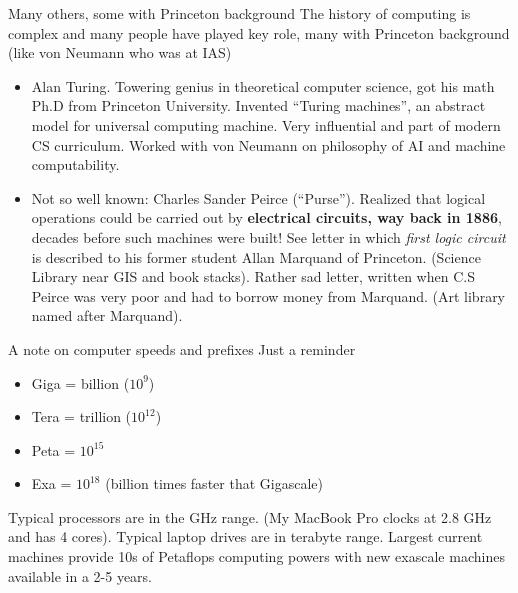\documentclass[aspectratio=169]{beamer}
\newcommand{\mypause}{\pause}
\begin{document}
\begin{frame}{Many others, some with Princeton background}
  The history of computing is complex and many people have played key
  role, many with Princeton background (like von Neumann who was at
  IAS)
  \begin{itemize}
  \item Alan Turing. Towering genius in theoretical computer science,
    got his math Ph.D from Princeton University. Invented ``Turing
    machines'', an abstract model for universal computing
    machine. Very influential and part of modern CS curriculum. Worked
    with von Neumann on philosophy of AI and machine computability.%
    \mypause%
  \item Not so well known: Charles Sander Peirce (``Purse''). Realized
    that logical operations could be carried out by {\bf electrical
      circuits, way back in 1886}, decades before such machines were
    built! See letter in which \emph{first logic circuit} is described
    to his former student Allan Marquand of Princeton. (Science
    Library near GIS and book stacks). Rather sad letter, written when
    C.S Peirce was very poor and had to borrow money from Marquand. (Art
    library named after Marquand).
  \end{itemize}
\end{frame}

\begin{frame}{A note on computer speeds and prefixes}
  Just a reminder
  \begin{itemize}
  \item Giga = billion ($10^9$)
  \item Tera = trillion ($10^{12}$)
  \item Peta = $10^{15}$
  \item Exa = $10^{18}$ (billion times faster that Gigascale)
  \end{itemize}
  Typical processors are in the GHz range. (My MacBook Pro clocks at
  2.8 GHz and has 4 cores). Typical laptop drives are in terabyte
  range. Largest current machines provide 10s of Petaflops computing
  powers with new exascale machines available in a 2-5 years.
\end{frame}
\end{document}
